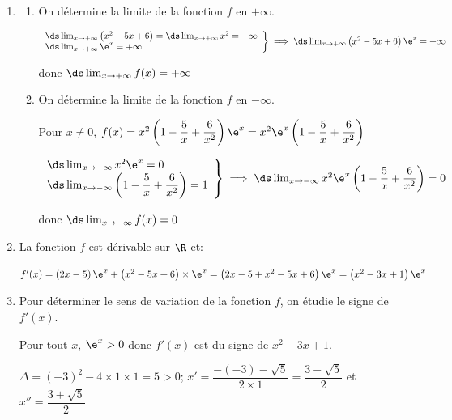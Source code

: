 
\begin{enumerate}
\item 
	\begin{enumerate}
		\item On détermine la limite de la fonction $f$ en $+\infty$.
		
$\left .
\begin{array}{l}
\ds\lim_{x\to +\infty} \left (x^2-5x+6\right ) = \ds\lim_{x\to +\infty} x^2 = +\infty\\
\ds\lim_{x\to +\infty} \e^{x} = +\infty
\end{array}
\right \}		
\implies
\ds\lim_{x\to +\infty} \left (x^2-5x+6\right )\e^{x} = +\infty$

donc
$\ds\lim_{x\to +\infty} f(x)=+\infty$		
		
		\item On détermine la limite de la fonction $f$ en $-\infty$.
		
Pour $x\neq 0$, $f(x)=x^2\left (1-\dfrac{5}{x} +\dfrac{6}{x^2}\right )\e^{x}	
= x^2\e^{x}\left (1-\dfrac{5}{x} +\dfrac{6}{x^2}\right )$

$\left .
\begin{array}{l}
\ds\lim_{x\to -\infty} x^2 \e^{x} = 0\\
\ds\lim_{x\to -\infty} \left (1-\dfrac{5}{x} +\dfrac{6}{x^2}\right )=1
\end{array}
\right \}		
\implies
\ds\lim_{x\to -\infty} x^2\e^{x}\left (1-\dfrac{5}{x} +\dfrac{6}{x^2}\right ) = 0$

donc
$\ds\lim_{x\to -\infty} f(x)=0$
		
	\end{enumerate}
\item %
La fonction $f$ est dérivable sur $\R$ et:

$f'(x)=\left (2x-5\right )\e^{x} + \left (x^2-5x+6\right )\times \e^{x}
= \left ( 2x-5+x^2-5x+6\right )\e^{x}
= \left (x^2-3x+1\right )\e^{x}$


\item Pour déterminer le sens de variation de la fonction $f$, on étudie le signe de $f'(x)$.

Pour tout $x$, $\e^{x}>0$ donc $f'(x)$ est du signe de $x^2-3x+1$.

$\Delta=(-3)^2-4\times 1 \times 1 = 5>0$;
$x'=\dfrac{-(-3)-\sqrt{5}}{2\times 1} = \dfrac{3-\sqrt{5}}{2}$
et $x''=\dfrac{3+\sqrt{5}}{2}$


\end{enumerate}
